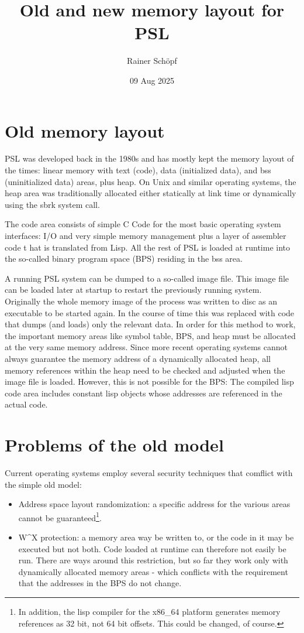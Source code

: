 \documentclass[a4paper]{article}
\title{Old and new memory layout for PSL}
\author{Rainer Schöpf}
\date{09 Aug 2025}
\begin{document}
\section{Old memory layout}

PSL was developed back in the 1980s and has mostly kept the memory
layout of the times: linear memory with text (code), data (initialized
data), and bss (uninitialized data) areas, plus heap. On Unix and
similar operating systems, the heap area was traditionally allocated
either statically at link time or dynamically using the sbrk system call.

The code area consists of simple C Code for the most basic operating
system interfaces: I/O and very simple memory management plus a layer
of assembler code t hat is translated from Lisp. All the rest of PSL
is loaded at runtime into the so-called binary program space (BPS)
residing in the bss area.

A running PSL system can be dumped to a so-called image file. This
image file can be loaded later at startup to restart the previously
running system. Originally the whole memory image of the process was
written to disc as an executable to be started again. In the course of
time this was replaced with code that dumps (and loads) only the
relevant data. In order for this method to work, the important memory
areas like symbol table, BPS, and heap must be allocated at the very
same memory address. Since more recent operating systems cannot always
guarantee the memory address of a dynamically allocated heap, all
memory references within the heap need to be checked and adjusted when
the image file is loaded. However, this is not possible for the BPS:
The compiled lisp code area includes constant lisp objects whose
addresses are referenced in the actual code.

\section{Problems of the old model}

Current operating systems employ several security techniques that
comflict with the simple old model:
\begin{itemize}
\item Address space layout randomization: a specific address for the
  various areas cannot be guaranteed\footnote{In addition, the lisp
    compiler for the x86\_64 platform generates memory references as
    32 bit, not 64 bit offsets. This could be changed, of course.}.

\item W\textasciicircum X protection: a memory area way be written to,
  or the code in it may be executed but not both. Code loaded at
  runtime can therefore not easily be run. There are ways around this
  restriction, but so far they work only with dynamically allocated
  memory areas - which conflicts with the requirement that the
  addresses in the BPS do not change.
  
\end{itemize}
\end{document}
